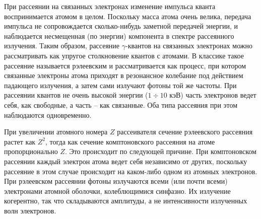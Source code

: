 \documentclass[a4paper,12pt]{article}
\begin{document}
При рассеянии на связанных электронах изменение импульса кванта воспринимается атомом в целом. Поскольку масса атома очень велика, передача импульса не сопровождается сколько-нибудь заметной передачей энергии, и наблюдается несмещенная (по энергии) компонента в спектре рассеянного излучения. Таким образом, рассеяние $\gamma$-квантов на связанных электронах можно рассматривать как упругое столкновение квантов с атомами. В классике такое рассеяние называется рэлеевским и рассматривается как процесс, при котором связанные электроны атома приходят в резонансное колебание под действием падающего излучения, а затем сами излучают фотоны той же частоты. При рассеянии квантов не очень высокой энергии ($1\div 10$ кэВ) часть электронов ведет себя, как свободные, а часть -- как связанные. Оба типа рассеяния при этом наблюдаются одновременно.\par
При увеличении атомного номера $Z$ рассеивателя сечение рэлеевского рассеяния растет как $Z^2$, тогда как сечение комптоновского рассеяния на атоме пропорционально $Z$. Это происходит по следующей причине. При комптоновском рассеянии каждый электрон атома ведет себя независимо от других, поскольку рассеяние в этом случае происходит на каком-либо одном из атомных электронов. При рэлеевском рассеянии фотоны излучаются всеми (или почти всеми) электронами атомной оболочки, колеблющимися синфазно. Их излучение когерентно, так что складываются амплитуды, а не интенсивности излученных волн электронов.\par
\end{document}
